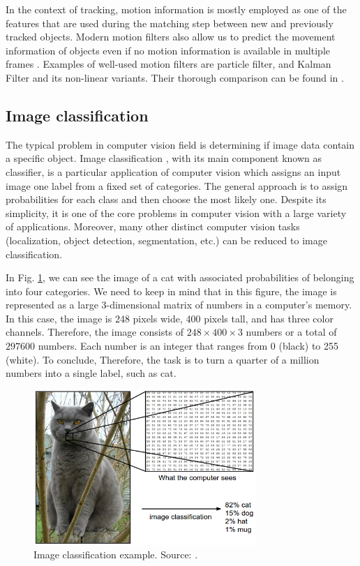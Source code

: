         In the context of tracking, motion information is mostly employed as one of the features that are used during the matching step between new and previously tracked objects. Modern motion filters also allow us to predict the movement information of objects even if no motion information is available in multiple frames \cite{labbe2015kalman}. Examples of well-used motion filters are particle filter, and Kalman Filter and its non-linear variants. Their thorough comparison can be found in \cite{labbe2015kalman}.
  
    \subsection{Image classification}
        The typical problem in computer vision field is determining if image data contain a specific object. Image classification \cite{russakovsky2015imagenet, krizhevsky2012imagenet, goodfellow2016deep}, with its main component known as classifier, is a particular application of computer vision which assigns an input image one label from a fixed set of categories. The general approach is to assign probabilities for each class and then choose the most likely one. Despite its simplicity, it is one of the core problems in computer vision with a large variety of applications. Moreover, many other distinct computer vision tasks (localization, object detection, segmentation, etc.) can be reduced to image classification.
        
        In Fig. \ref{fig:image_classification}, we can see the image of a cat with associated probabilities of belonging into four categories. We need to keep in mind that in this figure, the image is represented as a large 3-dimensional matrix of numbers in a computer's memory. In this case, the image is 248 pixels wide, 400 pixels tall, and has three color channels. Therefore, the image consists of $248 \times 400 \times 3$ numbers or a total of $297 600$ numbers. Each number is an integer that ranges from 0 (black) to 255 (white). To conclude, Therefore, the task is to turn a quarter of a million numbers into a single label, such as cat. \cite{cs231n}
        
        \begin{figure}[ht]
            \centering
            \includegraphics[width=0.75\textwidth]{resources/image_classification.png}
            \caption{Image classification example. Source: \cite{cs231n}.}
            \label{fig:image_classification}
        \end{figure}
    
